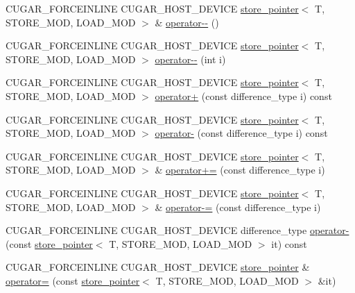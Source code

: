 \begin{DoxyCompactItemize}
C\+U\+G\+A\+R\+\_\+\+F\+O\+R\+C\+E\+I\+N\+L\+I\+NE C\+U\+G\+A\+R\+\_\+\+H\+O\+S\+T\+\_\+\+D\+E\+V\+I\+CE \hyperlink{structcugar_1_1cuda_1_1store__pointer}{store\+\_\+pointer}$<$ T, S\+T\+O\+R\+E\+\_\+\+M\+OD, L\+O\+A\+D\+\_\+\+M\+OD $>$ \& \hyperlink{structcugar_1_1cuda_1_1store__pointer_ad4d249c28459a8589dfe5a0cc3de4c59}{operator-\/-\/} ()
\item 
C\+U\+G\+A\+R\+\_\+\+F\+O\+R\+C\+E\+I\+N\+L\+I\+NE C\+U\+G\+A\+R\+\_\+\+H\+O\+S\+T\+\_\+\+D\+E\+V\+I\+CE \hyperlink{structcugar_1_1cuda_1_1store__pointer}{store\+\_\+pointer}$<$ T, S\+T\+O\+R\+E\+\_\+\+M\+OD, L\+O\+A\+D\+\_\+\+M\+OD $>$ \hyperlink{structcugar_1_1cuda_1_1store__pointer_a04163d0b7bb5d4ae359a2093f95ee157}{operator-\/-\/} (int i)
\item 
C\+U\+G\+A\+R\+\_\+\+F\+O\+R\+C\+E\+I\+N\+L\+I\+NE C\+U\+G\+A\+R\+\_\+\+H\+O\+S\+T\+\_\+\+D\+E\+V\+I\+CE \hyperlink{structcugar_1_1cuda_1_1store__pointer}{store\+\_\+pointer}$<$ T, S\+T\+O\+R\+E\+\_\+\+M\+OD, L\+O\+A\+D\+\_\+\+M\+OD $>$ \hyperlink{structcugar_1_1cuda_1_1store__pointer_a8ba7f0f228024195d9de88d3341c6aa6}{operator+} (const difference\+\_\+type i) const
\item 
C\+U\+G\+A\+R\+\_\+\+F\+O\+R\+C\+E\+I\+N\+L\+I\+NE C\+U\+G\+A\+R\+\_\+\+H\+O\+S\+T\+\_\+\+D\+E\+V\+I\+CE \hyperlink{structcugar_1_1cuda_1_1store__pointer}{store\+\_\+pointer}$<$ T, S\+T\+O\+R\+E\+\_\+\+M\+OD, L\+O\+A\+D\+\_\+\+M\+OD $>$ \hyperlink{structcugar_1_1cuda_1_1store__pointer_a1fbc683ea1005fd2fdd61202aa3532cf}{operator-\/} (const difference\+\_\+type i) const
\item 
C\+U\+G\+A\+R\+\_\+\+F\+O\+R\+C\+E\+I\+N\+L\+I\+NE C\+U\+G\+A\+R\+\_\+\+H\+O\+S\+T\+\_\+\+D\+E\+V\+I\+CE \hyperlink{structcugar_1_1cuda_1_1store__pointer}{store\+\_\+pointer}$<$ T, S\+T\+O\+R\+E\+\_\+\+M\+OD, L\+O\+A\+D\+\_\+\+M\+OD $>$ \& \hyperlink{structcugar_1_1cuda_1_1store__pointer_a64108b673ffc7922e87da39b76377216}{operator+=} (const difference\+\_\+type i)
\item 
C\+U\+G\+A\+R\+\_\+\+F\+O\+R\+C\+E\+I\+N\+L\+I\+NE C\+U\+G\+A\+R\+\_\+\+H\+O\+S\+T\+\_\+\+D\+E\+V\+I\+CE \hyperlink{structcugar_1_1cuda_1_1store__pointer}{store\+\_\+pointer}$<$ T, S\+T\+O\+R\+E\+\_\+\+M\+OD, L\+O\+A\+D\+\_\+\+M\+OD $>$ \& \hyperlink{structcugar_1_1cuda_1_1store__pointer_af80834aa861910066553de8f040f7bb2}{operator-\/=} (const difference\+\_\+type i)
\item 
C\+U\+G\+A\+R\+\_\+\+F\+O\+R\+C\+E\+I\+N\+L\+I\+NE C\+U\+G\+A\+R\+\_\+\+H\+O\+S\+T\+\_\+\+D\+E\+V\+I\+CE difference\+\_\+type \hyperlink{structcugar_1_1cuda_1_1store__pointer_ac9d439007996b673df79a7b699d05ed5}{operator-\/} (const \hyperlink{structcugar_1_1cuda_1_1store__pointer}{store\+\_\+pointer}$<$ T, S\+T\+O\+R\+E\+\_\+\+M\+OD, L\+O\+A\+D\+\_\+\+M\+OD $>$ it) const
\item 
C\+U\+G\+A\+R\+\_\+\+F\+O\+R\+C\+E\+I\+N\+L\+I\+NE C\+U\+G\+A\+R\+\_\+\+H\+O\+S\+T\+\_\+\+D\+E\+V\+I\+CE \hyperlink{structcugar_1_1cuda_1_1store__pointer}{store\+\_\+pointer} \& \hyperlink{structcugar_1_1cuda_1_1store__pointer_ad2149ae8bb302735b5a25ce73dd2f016}{operator=} (const \hyperlink{structcugar_1_1cuda_1_1store__pointer}{store\+\_\+pointer}$<$ T, S\+T\+O\+R\+E\+\_\+\+M\+OD, L\+O\+A\+D\+\_\+\+M\+OD $>$ \&it)
\end{DoxyCompactItemize}
